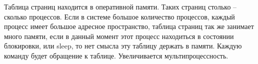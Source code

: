 Таблица страниц находится в оперативной памяти. Таких страниц столько – сколько процессов. Если в системе большое количество процессов, каждый процесс имеет большое адресное пространство, таблица страниц так же занимает много памяти, если в данный момент этот процесс находиться в состоянии блокировки, или sleep, то нет смысла эту таблицу держать в памяти. Каждую команду будет обращение к таблице. Увеличивается мультипроцессность. 